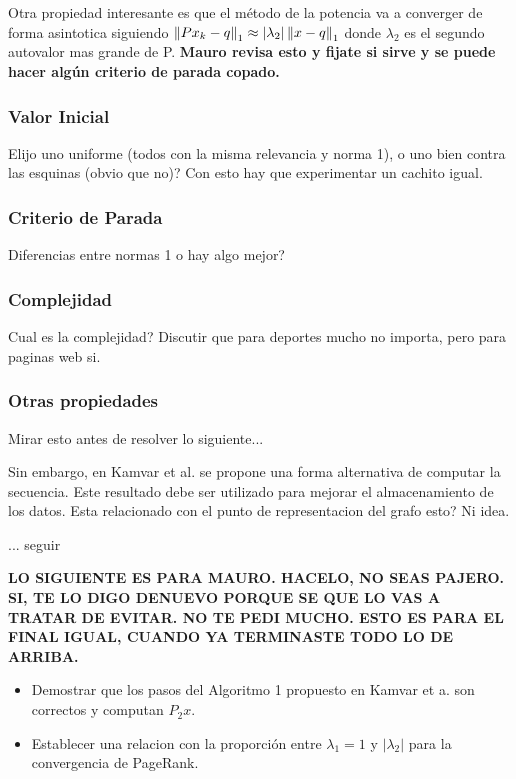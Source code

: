 Otra propiedad interesante es que el método de la potencia va a converger de forma asintotica siguiendo $\left\lVert Px_k - q\right\rVert_1 \approx |\lambda_2| \left\lVert x-q\right\rVert_1$ donde $\lambda_2$ es el segundo autovalor mas grande de P. \textbf{Mauro revisa esto y fijate si sirve y se puede hacer algún criterio de parada copado.}

\subsubsection{Valor Inicial}

Elijo uno uniforme (todos con la misma relevancia y norma 1), o uno bien contra las esquinas (obvio que no)? Con esto hay que experimentar un cachito igual.

\subsubsection{Criterio de Parada}

Diferencias entre normas 1 o hay algo mejor?

\subsubsection{Complejidad}

Cual es la complejidad? Discutir que para deportes mucho no importa, pero para paginas web si.

\subsubsection{Otras propiedades}

Mirar esto antes de resolver lo siguiente...

Sin embargo, en Kamvar et al. se propone una forma alternativa de computar la secuencia. Este resultado debe ser utilizado para mejorar el almacenamiento de los datos. Esta relacionado con el punto de representacion del grafo esto? Ni idea.

... seguir

\textbf{LO SIGUIENTE ES PARA MAURO. HACELO, NO SEAS PAJERO. SI, TE LO DIGO DENUEVO PORQUE SE QUE LO VAS A TRATAR DE EVITAR. NO TE PEDI MUCHO. ESTO ES PARA EL FINAL IGUAL, CUANDO YA TERMINASTE TODO LO DE ARRIBA.}

\begin{itemize}
\item Demostrar que los pasos del Algoritmo 1 propuesto en Kamvar et a. son correctos y computan $P_2x$.
\item Establecer una relacion con la proporción entre $\lambda_1 = 1$  y $|\lambda_2|$ para la convergencia de PageRank.
\end{itemize}
